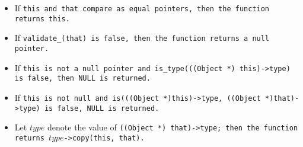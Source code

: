 \begin{itemize}[nosep]

\item If \tt{this} and \tt{that} compare as equal
pointers, then the function returns \tt{this}.

\item If \tt{validate_(that)} is \tt{false},
then the function returns a null pointer.

\item If \tt{this} is not a null pointer and \tt{is_type(((Object *)
this)->type)} is \tt{false}, then \tt{NULL} is returned.

\item If \tt{this} is not null and \tt{is(((Object *)this)->type,
((Object *)that)->type)} is \tt{false}, \tt{NULL} is returned.

\item Let $type$ denote the value of \tt{((Object *) that)->type};
then the function returns $type$\tt{->copy(this, that)}.

\end{itemize}
